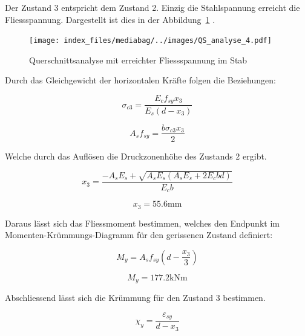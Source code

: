 \documentclass[
  12pt,
  letterpaper,
  egregdoesnotlikesansseriftitles]{scrreprt}
\begin{document}
Der Zustand 3 entspricht dem Zustand 2. Einzig die Stahlspannung
erreicht die Fliessspannung. Dargestellt ist dies in der
Abbildung~\ref{fig-qs4} .

\begin{figure}[H]

{\centering \texttt{[image: index\_files/mediabag/../images/QS\_analyse\_4.pdf]}

}

\caption{\label{fig-qs4}Querschnittsanalyse mit erreichter
Fliessspannung im Stab}

\end{figure}

Durch das Gleichgewicht der horizontalen Kräfte folgen die Beziehungen:

\begin{equation}\sigma_{c 3} = \frac{E_{c} f_{sy} x_{3}}{E_{s} \left(d - x_{3}\right)}\end{equation}

\begin{equation}A_{s} f_{sy} = \frac{b \sigma_{c 3} x_{3}}{2}\end{equation}

Welche durch das Auflösen die Druckzonenhöhe des Zustands 2 ergibt.

\begin{equation}x_{3} = \frac{- A_{s} E_{s} + \sqrt{A_{s} E_{s} \left(A_{s} E_{s} + 2 E_{c} b d\right)}}{E_{c} b}\end{equation}

\begin{equation}x_{3} = 55.6 \text{mm}\end{equation}

Daraus lässt sich das Fliessmoment bestimmen, welches den Endpunkt im
Momenten-Krümmungs-Diagramm für den gerissenen Zustand definiert:

\begin{equation}M_{y} = A_{s} f_{sy} \left(d - \frac{x_{3}}{3}\right)\end{equation}

\begin{equation}M_{y} = 177.2 \text{kN} \text{m}\end{equation}

Abschliessend lässt sich die Krümmung für den Zustand 3 bestimmen.

\begin{equation}\chi_{y} = \frac{\varepsilon_{sy}}{d - x_{3}}\end{equation}
\end{document}
